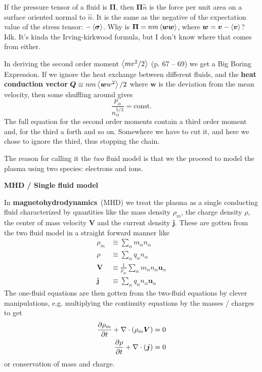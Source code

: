 \documentclass[10pt,landscape]{article}
\renewcommand{\vec}{\bm}
\newcommand{\topiccolor}{green}
\renewcommand{\section}[2]{%
	\renewcommand{\topiccolor}{#2}
	\begin{tcolorbox}[boxsep=0.5mm, left=1mm, right=1mm, top=0mm, bottom=0mm,
		colback=#2!30, colframe=#2, arc is angular]%
		\centering \textbf{#1}%
	\end{tcolorbox}%
	\nopagebreak%
}
\newcommand{\cbf}[1]{\textcolor{\topiccolor!80!black}{\textbf{#1}}}
\begin{document}
\begin{multicols*}{3}
\begin{tcolorbox}[title=An aside: wtf is a \textit{pressure tensor}?,
	colframe=\topiccolor!10!white, colback=white, coltitle=\topiccolor]
	If the pressure tensor of a fluid is $\vec \Pi$, then $\vec \Pi \hat n$ is
	the force per unit area on a surface oriented normal to $\hat n$.
	It is the same as the negative of the expectation value of the stress
	tensor: $-\expval{\vec \sigma}$.
	Why is $\vec \Pi = n m \expval{\vec w \vec w}$, where $\vec w = \vec v -
	\expval{\vec v}$? Idk. It's kinda the Irving-kirkwood formula, but I don't
	know where that comes from either.
\end{tcolorbox}

In deriving the second order moment $\left\langle mv^2/2\right\rangle$ (p. 67 -- 69) we get
a Big Boring Expression\texttrademark.
If we ignore the heat exchange between different fluids, and the
\cbf{heat conduction vector}
$\vec Q \equiv n m \expval{\vec w w^2} / 2$
where $\vec w$ is the deviation from the mean velocity,
then some shuffling around gives
\[
	\frac{p_\alpha}{n_\alpha^{5/3}} = \text{const.}
\]
The full equation for the second order moments contain a third order moment and,
for the third a forth and so on.
Somewhere we have to cut it, and here we chose to ignore the third,
thus stopping the chain.

The reason for calling it the \emph{two} fluid model is that we the proceed
to model the plasma using two species: electrons and ions.

\section{MHD / Single fluid model}{lime}

In \cbf{magnetohydrodynamics} (MHD) we treat the plasma as a single conducting
fluid characterized by quantities like the mass density $\rho_m$, the charge
density $\rho$, the center of mass velocity $\vec V$ and the current density
$\vec j$.
These are gotten from the two fluid model in a straight forward manner like
\begin{align*}
	\rho_m &\equiv \sum_\alpha m_\alpha n_\alpha\\
	\rho &\equiv \sum_\alpha q_\alpha n_\alpha\\
	\vec V &\equiv \frac{1}{\rho_m} \sum_\alpha m_\alpha n_\alpha \vec u_\alpha\\
	\vec j &\equiv \sum_\alpha q_\alpha n_\alpha \vec u_\alpha
\end{align*}
The one-fluid equations are then gotten from the two-fluid equations by clever
manipulations, e.g. multiplying the continuity equations by the masses / charges
to get
\begin{align*}
	\diffp{\rho_m}{t} + \nabla \cdot (\rho_m \vec V) = 0\\
	\diffp{\rho}{t} + \nabla \cdot (\vec j) = 0
\end{align*}
or conservation of mass and charge.


\end{multicols*}
\end{document}
